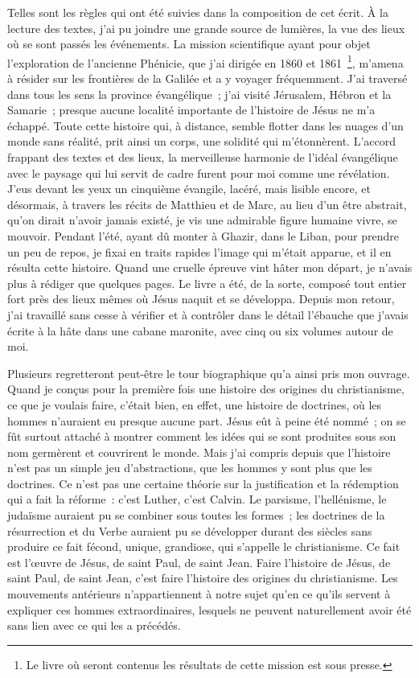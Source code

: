 \documentclass[french,twoside]{book} %
\begin{document}
Telles sont les règles qui ont été suivies dans la composition de cet écrit. À la lecture des textes, j’ai pu joindre une grande source de lumières, la vue des lieux où se sont passés les événements. La mission scientifique ayant pour objet l’exploration de l’ancienne Phénicie, que j’ai dirigée en 1860 et 1861 \footnote{Le livre où seront contenus les résultats de cette mission est sous presse.}, m’amena à résider sur les frontières de la Galilée et a y voyager fréquemment. J’ai traversé dans tous les sens la province évangélique ; j’ai visité Jérusalem, Hébron et la Samarie ; presque aucune localité importante de l’histoire de Jésus ne m’a échappé. Toute cette histoire qui, à distance, semble flotter dans les nuages d’un monde sans réalité, prit ainsi un corps, une solidité qui m’étonnèrent. L’accord frappant des textes et des lieux, la merveilleuse harmonie de l’idéal évangélique avec le paysage qui lui servit de cadre furent pour moi comme une révélation. J’eus devant les yeux un cinquième évangile, lacéré, mais lisible encore, et désormais, à travers les récits de Matthieu et de Marc, au lieu d’un être abstrait, qu’on dirait n’avoir jamais existé, je vis une admirable figure humaine vivre, se mouvoir. Pendant l’été, ayant dû monter à Ghazir, dans le Liban, pour prendre un peu de repos, je fixai en traits rapides l’image qui m’était apparue, et il en résulta cette histoire. Quand une cruelle épreuve vint hâter mon départ, je n’avais plus à rédiger que quelques pages. Le livre a été, de la sorte, composé tout entier fort près des lieux mêmes où Jésus naquit et se développa. Depuis mon retour, j’ai travaillé sans cesse à vérifier et à contrôler dans le détail l’ébauche que j’avais écrite à la hâte dans une cabane maronite, avec cinq ou six volumes autour de moi.\par
Plusieurs regretteront peut-être le tour biographique qu’a ainsi pris mon ouvrage. Quand je conçus pour la première fois une histoire des origines du christianisme, ce que je voulais faire, c’était bien, en effet, une histoire de doctrines, où les hommes n’auraient eu presque aucune part. Jésus eût à peine été nommé ; on se fût surtout attaché à montrer comment les idées qui se sont produites sous son nom germèrent et couvrirent le monde. Mais j’ai compris depuis que l’histoire n’est pas un simple jeu d’abstractions, que les hommes y sont plus que les doctrines. Ce n’est pas une certaine théorie sur la justification et la rédemption qui a fait la réforme : c’est Luther, c’est Calvin. Le parsisme, l’hellénisme, le judaïsme auraient pu se combiner sous toutes les formes ; les doctrines de la résurrection et du Verbe auraient pu se développer durant des siècles sans produire ce fait fécond, unique, grandiose, qui s’appelle le christianisme. Ce fait est l’œuvre de Jésus, de saint Paul, de saint Jean. Faire l’histoire de Jésus, de saint Paul, de saint Jean, c’est faire l’histoire des origines du christianisme. Les mouvements antérieurs n’appartiennent à notre sujet qu’en ce qu’ils servent à expliquer ces hommes extraordinaires, lesquels ne peuvent naturellement avoir été sans lien avec ce qui les a précédés.\par
\end{document}

